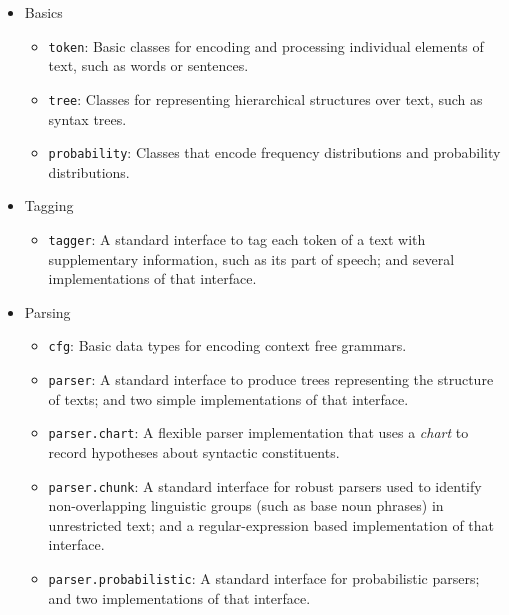 \documentclass[11pt]{article}
\def\nogap{\setlength\itemsep{.0in}\setlength{\parskip}{0in}}
\begin{document}
{%
\begin{itemize}\nogap

  \item Basics
    \begin{itemize}\nogap
      \item \texttt{token}: Basic classes for encoding and processing
            individual elements of text, such as words or sentences. 
      \item \texttt{tree}: Classes for representing hierarchical structures
            over text, such as syntax trees.
      \item \texttt{probability}: Classes that encode frequency
            distributions and probability distributions.
    \end{itemize}

  \item Tagging
    \begin{itemize}\nogap
      \item \texttt{tagger}: A standard interface to tag each token of
            a text with supplementary information, such as its part of
            speech; and several implementations of that interface.
    \end{itemize}

  \item Parsing
    \begin{itemize}\nogap
      \item \texttt{cfg}: Basic data types for encoding context free
            grammars. 
      \item \texttt{parser}: A standard interface to produce trees
            representing the structure of texts; and two
            simple implementations of that interface.
      \item \texttt{parser.chart}: A flexible parser implementation
            that uses a \emph{chart} to record hypotheses about
            syntactic constituents. 
      \item \texttt{parser.chunk}: A standard interface for robust
            parsers used to identify non-overlapping linguistic groups
            (such as base noun phrases) in unrestricted text; and a
            regular-expression based implementation of that interface.
      \item \texttt{parser.probabilistic}: A standard interface for
            probabilistic parsers; and two implementations of that
            interface. 
    \end{itemize}


\end{itemize}}
\end{document}
